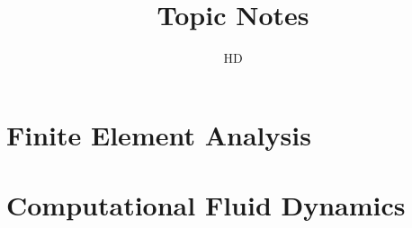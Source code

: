 \documentclass[11pt]{report}
\title{%
  Topic Notes}
\author{HD
}
\begin{document}


\fancyhf{}
\fancyfoot[R]{ \bf\thepage\ \rm }%

\newpage
\tableofcontents
\newpage
\listoffigures
\listoftables
\newpage

\part{Finite Element Analysis}

\part{Computational Fluid Dynamics}

%
%
%
\end{document}
